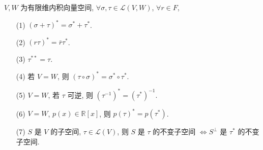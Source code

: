 \documentclass{note}
\begin{document}
\begin{thm}[(课本定理 10.2)]
    $V,W$ 为有限维内积向量空间, $\forall\sigma,\tau\in\mathcal{L}(V,W)$, $\forall r\in F$,
    \begin{itemize}
        \item[(1)] $(\sigma+\tau)^*=\sigma^*+\tau^*$.
        \item[(2)] $(r\tau)^*=\bar{r}\tau^*$.
        \item[(3)] $\tau^{**}=\tau$.
        \item[(4)] 若 $V=W$, 则 $(\tau\circ\sigma)^*=\sigma^*\circ\tau^*$.
        \item[(5)] $V=W$, 若 $\tau$ 可逆, 则 $(\tau^{-1})^*=(\tau^*)^{-1}$.
        \item[(6)] $V=W$, $p(x)\in\mathbb{R}[x]$, 则 $p(\tau)^*=p(\tau^*)$.
        \item[(7)] $S$ 是 $V$ 的子空间, $\tau\in\mathcal{L}(V)$, 则 $S$ 是 $\tau$ 的不变子空间 $\Longleftrightarrow S^{\perp}$ 是 $\tau^*$ 的不变子空间.
    \end{itemize}
\end{thm}
\end{document}
